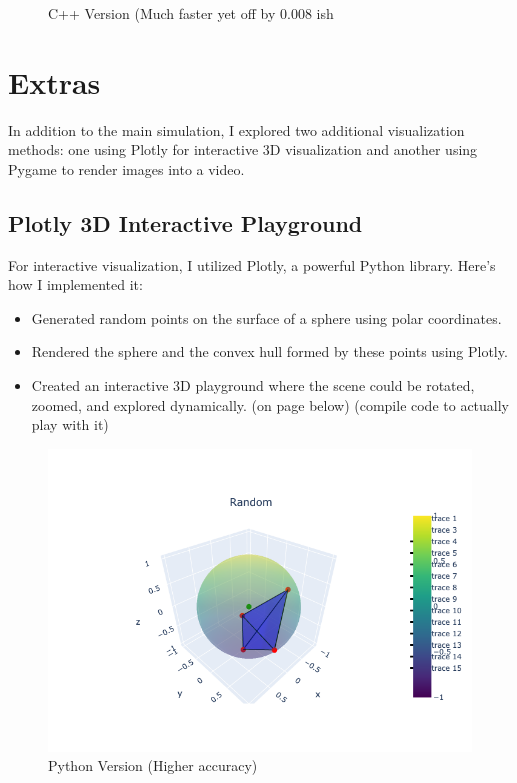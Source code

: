 \documentclass{article}
\begin{document}
\begin{figure}[H]
\begin{minipage}[b]{0.45\textwidth}
        \caption{C++ Version (Much faster yet off by 0.008 ish}
        \label{fig:center_outside}
    \end{minipage}
\end{figure}


\section{Extras}

In addition to the main simulation, I explored two additional visualization methods: one using Plotly for interactive 3D visualization and another using Pygame to render images into a video.

\subsection{Plotly 3D Interactive Playground}
For interactive visualization, I utilized Plotly, a powerful Python library. Here's how I implemented it:

\begin{itemize}
    \item Generated random points on the surface of a sphere using polar coordinates.
    \item Rendered the sphere and the convex hull formed by these points using Plotly.
    \item Created an interactive 3D playground where the scene could be rotated, zoomed, and explored dynamically. (on page below) (compile code to actually play with it)
\end{itemize}
\begin{figure}[H]
    \centering
    \begin{minipage}[b]{0.9\textwidth}
        \centering
        \includegraphics[width=\textwidth]{plotly.png} 
        \caption{Python Version (Higher accuracy)}
        \label{fig:center_inside}
    \end{minipage}
\end{figure}
\end{document}
